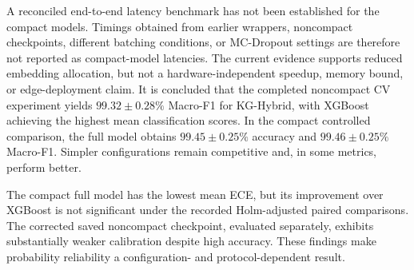 A reconciled end-to-end latency benchmark has not been established
for the compact models. Timings obtained from earlier wrappers,
noncompact checkpoints, different batching conditions, or
MC-Dropout settings are therefore not reported as compact-model
latencies. The current evidence supports reduced embedding
allocation, but not a hardware-independent speedup, memory bound,
or edge-deployment claim. It is concluded that the 
 completed noncompact CV experiment yields
$99.32\pm0.28\%$ Macro-F1 for KG-Hybrid, with XGBoost
achieving the highest mean classification scores.
In the compact controlled comparison, the full model obtains
$99.45\pm0.25\%$ accuracy and
$99.46\pm0.25\%$ Macro-F1.
Simpler configurations remain competitive and, in some metrics,
perform better.

The compact full model has the lowest mean ECE, but its improvement
over XGBoost is not significant under the recorded Holm-adjusted
paired comparisons. The corrected saved noncompact checkpoint,
evaluated separately, exhibits substantially weaker calibration
despite high accuracy. These findings make probability reliability
a configuration- and protocol-dependent result.

